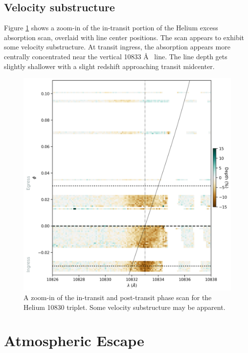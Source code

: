 \documentclass[twocolumn]{aastex631}
\begin{document}
\subsection{Velocity substructure}
Figure \ref{fig:HeliumScanZoom} shows a zoom-in of the in-transit portion of the Helium excess absorption scan, overlaid with line center positions.  The scan appears to exhibit some velocity substructure.  At transit ingress, the absorption appears more centrally concentrated near the vertical 10833 \AA~ line.  The line depth gets slightly shallower with a slight redshift approaching transit midcenter. 

\begin{figure}
    \includegraphics[width=\linewidth]{figures/phase_2D_diagram_zoom.png}
    \caption{A zoom-in of the in-transit and post-transit phase scan for the Helium 10830 triplet.  Some velocity substructure may be apparent.}
    \label{fig:HeliumScanZoom}
\end{figure}


\section{Atmospheric Escape}
\end{document}
